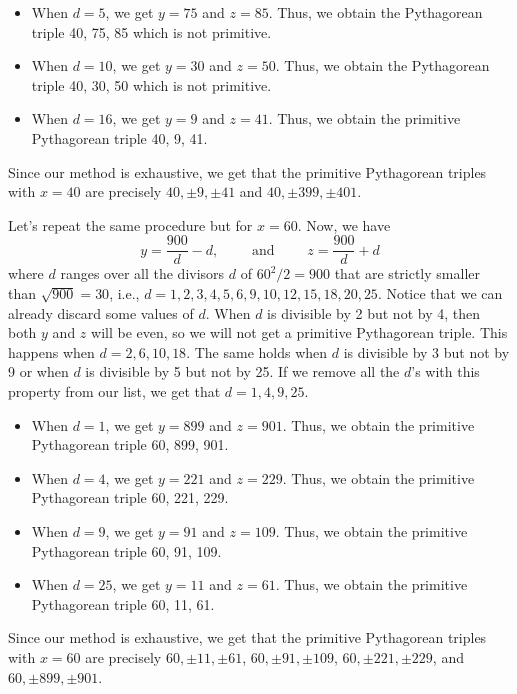 \begin{solution}
\begin{enumerate}
\begin{itemize}
            \item When $d = 5$, we get $y = 75$ and $z = 85$. Thus, we obtain the Pythagorean triple 40, 75, 85 which is not primitive.
            \item When $d = 10$, we get $y = 30$ and $z = 50$. Thus, we obtain the Pythagorean triple 40, 30, 50 which is not primitive.
            \item When $d = 16$, we get $y = 9$ and $z = 41$. Thus, we obtain the primitive Pythagorean triple 40, 9, 41.
        \end{itemize}
        Since our method is exhaustive, we get that the primitive Pythagorean triples with $x = 40$ are precisely $40, \pm 9, \pm 41$ and $40, \pm 399, \pm 401$.
        
        Let's repeat the same procedure but for $x = 60$. Now, we have
        $$y = \frac{900}{d} - d, \qquad \text{ and } \qquad z = \frac{900}{d} + d$$
        where $d$ ranges over all the divisors $d$ of $60^2/2 = 900$ that are strictly smaller than $\sqrt{900} = 30$, i.e., $d = 1,2,3,4,5,6,9,10,12,15,18,20, 25$. Notice that we can already discard some values of $d$. When $d$ is divisible by 2 but not by 4, then both $y$ and $z$ will be even, so we will not get a primitive Pythagorean triple. This happens when $d = 2,6,10,18$. The same holds when $d$ is divisible by 3 but not by 9 or when $d$ is divisible by 5 but not by 25. If we remove all the $d$'s with this property from our list, we get that $d = 1,4, 9, 25$. 
        \begin{itemize}
            \item When $d = 1$, we get $y = 899$ and $z = 901$. Thus, we obtain the primitive Pythagorean triple 60, 899, 901.
            \item When $d = 4$, we get $y = 221$ and $z = 229$. Thus, we obtain the primitive Pythagorean triple 60, 221, 229.
            \item When $d = 9$, we get $y = 91$ and $z = 109$. Thus, we obtain the primitive Pythagorean triple 60, 91, 109.
            \item When $d = 25$, we get $y = 11$ and $z = 61$. Thus, we obtain the primitive Pythagorean triple 60, 11, 61.
        \end{itemize}
        Since our method is exhaustive, we get that the primitive Pythagorean triples with $x = 60$ are precisely $60, \pm 11, \pm 61$, $60, \pm 91, \pm 109$, $60, \pm 221, \pm 229$, and $60, \pm 899, \pm 901$. \\
    \end{enumerate}
\end{solution}

